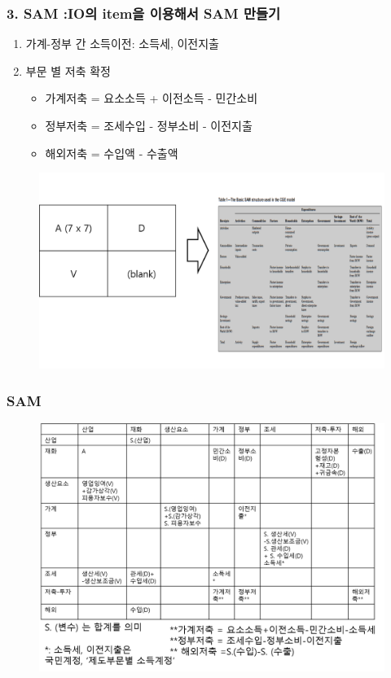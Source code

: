 \documentclass{beamer}
\begin{document}
\begin{frame}
	\frametitle{3. SAM :IO의 item을 이용해서 SAM 만들기}
	\begin{enumerate}
	\item{가계-정부 간 소득이전: 소득세, 이전지출}
	\item{부문 별 저축 확정}
		\begin{itemize}
		\item{가계저축 = 요소소득 + 이전소득 - 민간소비}
		\item{정부저축 = 조세수입 - 정부소비 - 이전지출}
		\item{해외저축 = 수입액 - 수출액 }
		\end{itemize}
	\end{enumerate}
	\begin{figure}
		\centering
		\includegraphics[width=1.00\textwidth]{IOtoSAM.png}
	\end{figure}


\end{frame}


\begin{frame}
	\frametitle{SAM}

	\begin{figure}
		\centering
		\includegraphics[width=1.00\textwidth]{sam.png}
	\end{figure}
\end{frame}
\end{document}
